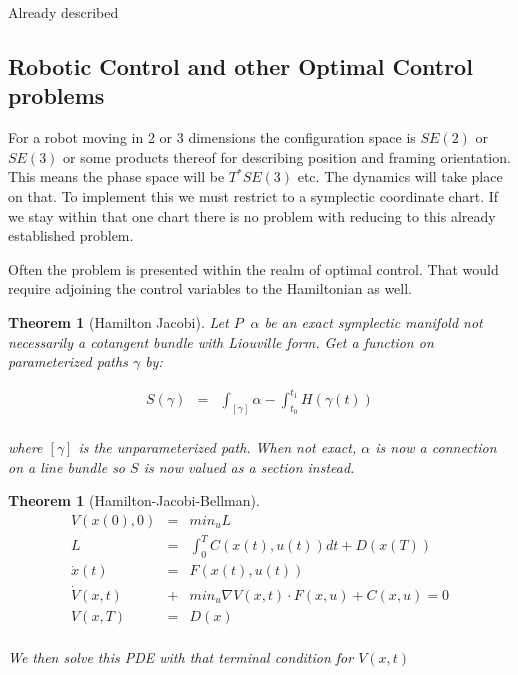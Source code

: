 \documentclass[a4paper,landscape]{article}
\theoremstyle{change}
\newtheorem{thm}[equation]{Theorem}
\theoremstyle{nonumberplain}
\numberwithin{equation}{section}
\begin{document}
Already described

\subsection{Robotic Control and other Optimal Control problems}

For a robot moving in 2 or 3 dimensions the configuration space is $SE(2)$ or $SE(3)$ or some products thereof for describing position and framing orientation. This means the phase space will be $T^* SE(3)$ etc. The dynamics will take place on that. To implement this we must restrict to a symplectic coordinate chart. If we stay within that one chart there is no problem with reducing to this already established problem.

Often the problem is presented within the realm of optimal control. That would require adjoining the control variables to the Hamiltonian as well.

\begin{thm}[Hamilton Jacobi]

Let $P \; \; \alpha$ be an exact symplectic manifold not necessarily a cotangent bundle with Liouville form. Get a function on parameterized paths $\gamma$ by:

\begin{eqnarray*}
S (\gamma ) &=& \int_{[\gamma]} \alpha - \int_{t_0}^{t_1} H( \gamma (t) )\\
\end{eqnarray*}

where $[\gamma]$ is the unparameterized path. When not exact, $\alpha$ is now a connection on a line bundle so $S$ is now valued as a section instead.


\end{thm}

\begin{thm}[Hamilton-Jacobi-Bellman]
\begin{eqnarray*}
V ( x(0) , 0 ) &=& min_u L\\
L &=& \int_0^T C ( x(t), u(t)) dt + D(x(T))\\
\dot{x} (t) &=& F ( x(t), u(t) )\\
\dot{V} (x ,t ) &+& min_u \nabla V(x,t) \cdot F(x,u) + C(x,u) = 0\\
V(x,T) &=& D(x)\\
\end{eqnarray*}

We then solve this PDE with that terminal condition for $V(x,t)$

\end{thm}
\end{document}
